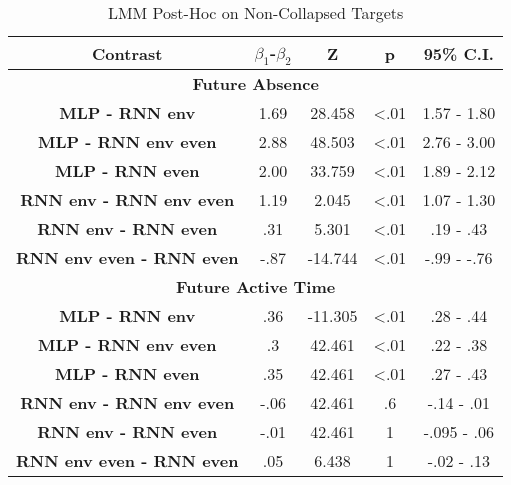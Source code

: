 \begin{table}[h]
\centering
\caption{LMM Post-Hoc on Non-Collapsed Targets}
\label{exploded_post_hoc_33}
\begin{tabular}{ccccc}
\hline
\textbf{Contrast}  & \textbf{$\beta_1$-$\beta_2$} & \textbf{Z} & \textbf{p} & \textbf{95\% C.I.}                  \\ \hline
\multicolumn{5}{c}{\textbf{Future Absence}}                                                                         \\ \hline
\textbf{MLP - RNN env} & 1.69                & 28.458     & \textless .01   & 1.57 - 1.80                    \\
\textbf{MLP - RNN env even}           & 2.88                & 48.503     & \textless .01   & 2.76 - 3.00                     \\
\textbf{MLP - RNN even}           & 2.00                & 33.759     & \textless .01   &  1.89 - 2.12                     \\
\textbf{RNN env - RNN env even}           & 1.19                & 2.045     & \textless .01   & 1.07 - 1.30                     \\
\textbf{RNN env - RNN even}           & .31                & 5.301     & \textless .01   & .19 - .43                     \\
\textbf{RNN env even - RNN even}          & -.87                & -14.744     & \textless .01   & -.99 - -.76                    \\ \hline

\multicolumn{5}{c}{\textbf{Future Active Time}}                                                                     \\ \hline
\textbf{MLP - RNN env} & .36                & -11.305     & \textless .01   & .28 - .44                     \\
\textbf{MLP - RNN env even}           & .3                 & 42.461     & \textless .01   & .22 - .38                     \\
\textbf{MLP - RNN even}           & .35                & 42.461     & \textless .01   & .27 - .43                     \\
\textbf{RNN env - RNN env even}           & -.06                & 42.461     & .6   & -.14 - .01                     \\
\textbf{RNN env - RNN even}           & -.01                & 42.461     &  1   & -.095 - .06                     \\
\textbf{RNN env even - RNN even}          & .05                & 6.438     &  1   & -.02 - .13                    \\ \hline


\end{tabular}
\end{table}
